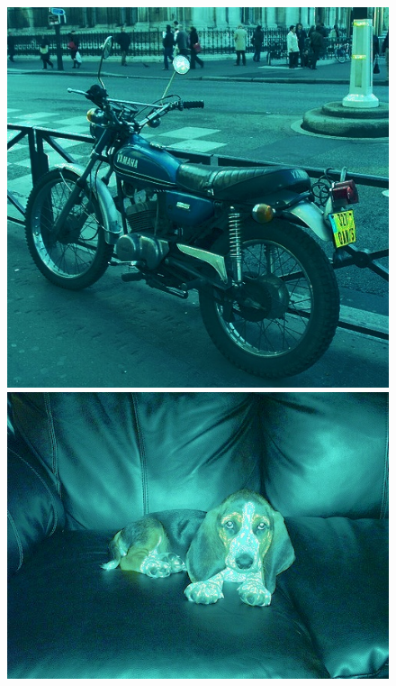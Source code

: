 \begin{appendices}
\begin{figure}[htb]
\center
\begin{minipage}{0.19\textwidth}
\includegraphics[width=\textwidth]{images/anomalien/HS/007911.jpg}
\end{minipage}
\begin{minipage}{0.19\textwidth}
\includegraphics[width=\textwidth]{images/anomalien/HS/007935.jpg}
\end{minipage}
\begin{minipage}{0.19\textwidth}

\end{minipage}
\end{figure}
\end{appendices}
